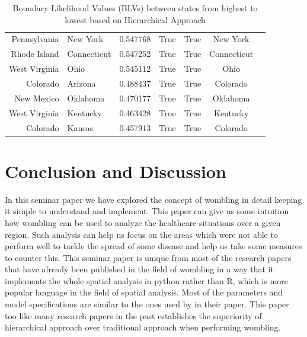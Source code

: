 \documentclass[enabledeprecatedfontcommands,parskip=half,twoside=semi,BCOR=0mm]{scrreprt}
\numberwithin{equation}{chapter}
\theoremstyle{definition}
\theoremstyle{remark}
\begin{document}
\begin{table}[h!]
\begin{adjustbox}{max width=\textwidth}
\begin{tabular}{|r|l|l|r|c|c|l|}
        Pennsylvania & New York & 0.547768 & True & True & New York \\
        Rhode Island & Connecticut & 0.547252 & True & True & Connecticut \\
        West Virginia & Ohio & 0.545112 & True & True & Ohio \\
        Colorado & Arizona & 0.488437 & True & True & Colorado \\
        New Mexico & Oklahoma & 0.470177 & True & True & Oklahoma \\
        West Virginia & Kentucky & 0.463428 & True & True & Kentucky \\
        Colorado & Kansas & 0.457913 & True & True & Colorado \\
        \hline
    \end{tabular}
    \end{adjustbox}
    \caption{Boundary Likelihood Values (BLVs) between states from highest to lowest based on Hierarchical Approach}
    \label{tab:boundary_diff}
    \end{table}

    \chapter{Conclusion and Discussion}
    In this seminar paper we have explored the concept of wombling in detail keeping it simple to understand and implement. This paper can give us some intuition how wombling can be used to analyze the healthcare situations over a given region. Such analysis can help us focus on the areas which were not able to perform well to tackle the spread of some disease and help us take some measures to counter this. This seminar paper is unique from most of the research papers that have already been published in the field of wombling in a way that it implements the whole spatial analysis in python rather than R, which is more popular language in the field of spatial analysis. Most of the parameters and model specifications are similar to the ones used by \cite{Lu_Carlin.2005} in their paper. This paper too like many research papers in the past establishes the superiority of hierarchical approach over traditional approach when performing wombling.
    
\end{document}
